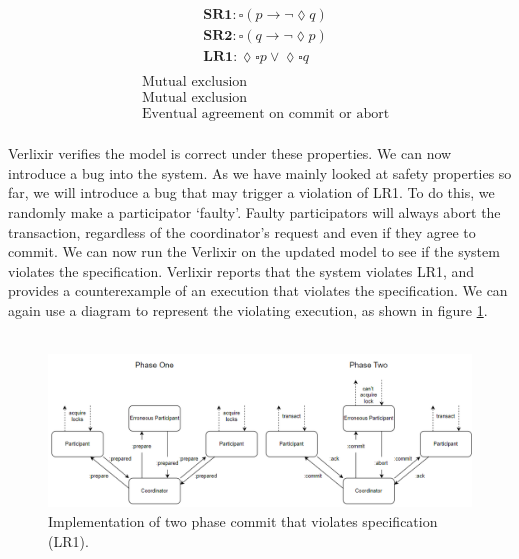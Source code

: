 \begin{multicols}{2}
    \[
    \begin{aligned}
    &\textbf{SR1}: \square \left( p \rightarrow \neg \lozenge q \right) \\
    &\textbf{SR2}: \square \left( q \rightarrow \neg \lozenge p \right) \\
    &\textbf{LR1}: \lozenge \square p \lor \lozenge \square q \\
    \end{aligned}
    \]
    \vline
    \[
    \begin{aligned}
    &\text{Mutual exclusion} \\
    &\text{Mutual exclusion} \\
    &\text{Eventual agreement on commit or abort} \\
    \end{aligned}
    \]
\end{multicols}
Verlixir verifies the model is correct under these properties. We can now introduce a bug into the system. As we have mainly looked at safety properties so far, we will introduce a bug that may trigger a violation of LR1. To do this, we randomly make a participator `faulty'. Faulty participators will always abort the transaction, regardless of the coordinator's request and even if they agree to commit. We can now run the Verlixir on the updated model to see if the system violates the specification. Verlixir reports that the system violates LR1, and provides a counterexample of an execution that violates the specification. We can again use a diagram to represent the violating execution, as shown in figure \ref{fig:2pc}.
\\ \\
\begin{figure}[h]
    \centering
    \includegraphics[width=1\textwidth]{images/2pc.png}
    \caption{Implementation of two phase commit that violates specification (LR1).}
    \label{fig:2pc}
\end{figure}
\\ \\
